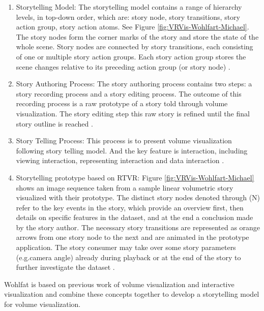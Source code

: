 \documentclass{egpubl}
\begin{document}
\begin{enumerate}
\item Storytelling Model: The storytelling model contains a range of hierarchy levels, in top-down order, which are: story node, story transitions, story action group, story action atoms. See Figure \ref{fig:VRVis-Wohlfart-Michael}. The story nodes form the corner marks of the story and store the state of the whole scene. Story nodes are connected by story transitions, each consisting of one or multiple story action groups. Each story action group stores the scene changes relative to its preceding action group (or story node) \cite{wohlfat}.

\item Story Authoring Process: The story authoring process contains two steps: a story recording process and a story editing process. The outcome of this recording process is a raw prototype of a story told through volume visualization. The story editing step this raw story is refined until the final story outline is reached \cite{wohlfat}.
\item Story Telling Process: This process is to present volume visualization following story telling model. And the key feature is interaction, including viewing interaction, representing interaction and data interaction \cite{wohlfat}.
\item Storytelling prototype based on RTVR: Figure \ref{fig:VRVis-Wohlfart-Michael} shows an image sequence taken from a sample linear volumetric story visualized with their prototype. The distinct story nodes denoted through (N) refer to the key events in the story, which provide an overview first, then details on specific features in the dataset, and at the end a conclusion made by the story author. The necessary story transitions are represented as orange arrows from one story node to the next and are animated in the prototype application. The story consumer may take over some story parameters (e.g.camera angle) already during playback or at the end of the story to further investigate the dataset \cite{wohlfat}.
\end{enumerate}
Wohlfat is based on previous work of volume visualization \cite{Amy,robert,Ivan} and interactive visualization \cite{merlin}and combine these concepts together to develop a storytelling model for volume visualization.
\end{document}
